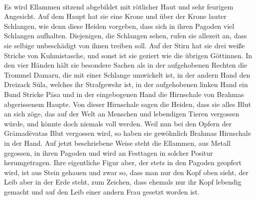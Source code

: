 \documentclass{article}
\begin{document}
\paragraph{}
Es wird Ellammen sitzend abgebildet mit rötlicher Haut und sehr feurigem Angesicht. Auf dem Haupt hat sie eine Krone und über der Krone lauter Schlangen, wie denn diese Heiden vorgeben, dass sich in ihren Pagoden viel Schlangen aufhalten. Diejenigen, die Schlangen sehen, rufen sie allezeit an, dass sie selbige unbeschädigt von ihnen treiben soll. Auf der Stirn hat sie drei weiße Striche von Kuhmistasche, und sonst ist sie geziert wie die übrigen Göttinnen. In den vier Händen hält sie besondere Sachen als in der aufgehobenen Rechten die Trommel Damaru, die mit einer Schlange umwickelt ist, in der andern Hand den Dreizack S\={u}la, welches ihr Strafgewehr ist, in der aufgehobenen linken Hand ein Bund Stricke P\={a}sa und in der eingebogenen Hand die Hirnschale von Brahmas abgerissenem Haupte. Von dieser Hirnschale sagen die Heiden, dass sie alles Blut an sich zöge, das auf der Welt an Menschen und lebendigen Tieren vergossen würde, und könnte doch niemals voll werden. Weil nun bei den Opfern der Gr\={a}mad\={e}vatas Blut vergossen wird, so haben sie gewöhnlich Brahmas Hirnschale in der Hand. Auf jetzt beschriebene Weise steht die Ellammen, aus Metall gegossen, in ihren Pagoden und wird an Festtagen in solcher Positur herumgetragen. Ihre eigentliche Figur aber, der stets in den Pagoden geopfert wird, ist aus Stein gehauen und zwar so, dass man nur den Kopf oben sieht, der Leib aber in der Erde steht, zum Zeichen, dass ehemals nur ihr Kopf lebendig gemacht und auf den Leib einer andern Frau gesetzt worden ist.
\end{document}
